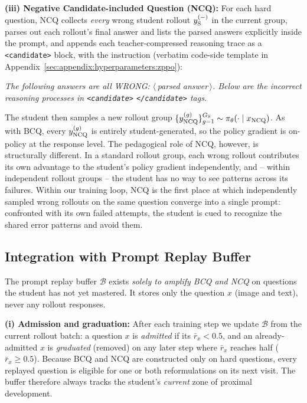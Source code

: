 \textbf{(iii) Negative Candidate-included Question (NCQ):} For each hard question, NCQ collects \emph{every} wrong student rollout $y_{\rm S}^{(-)}$ in the current group, parses out each rollout's final answer and lists the parsed answers explicitly inside the prompt, and appends each teacher-compressed reasoning trace as a \texttt{<candidate>} block, with the instruction (verbatim code-side template in Appendix~\ref{sec:appendix:hyperparameters:zppo}):
\begin{prompttemplate}
\footnotesize
\emph{The following answers are all WRONG: $\langle$\,parsed answer\,$\rangle$. Below are the incorrect reasoning processes in \texttt{<candidate>} \texttt{</candidate>} tags.}
\end{prompttemplate}
The student then samples a new rollout group $\{y_{\rm NCQ}^{(g)}\}_{g=1}^{G_{\rm S}} \sim \pi_\theta(\cdot \mid x_{\rm NCQ})$. As with BCQ, every $y_{\rm NCQ}^{(g)}$ is entirely student-generated, so the policy gradient is on-policy at the response level. The pedagogical role of NCQ, however, is structurally different. In a standard rollout group, each wrong rollout contributes its own advantage to the student's policy gradient independently, and -- within independent rollout groups -- the student has no way to see patterns across its failures. Within our training loop, NCQ is the first place at which independently sampled wrong rollouts on the same question converge into a single prompt: confronted with its own failed attempts, the student is cued to recognize the shared error patterns and avoid them.


\subsection{Integration with Prompt Replay Buffer}
\label{sec:method:buffer}

The prompt replay buffer $\mathcal{B}$ exists \emph{solely to amplify BCQ and NCQ} on questions the student has not yet mastered. It stores only the question $x$ (image and text), never any rollout responses.

\textbf{(i) Admission and graduation:} After each training step we update $\mathcal{B}$ from the current rollout batch: a question $x$ is \emph{admitted} if its $\bar{r}_x\!<\!0.5$, and an already-admitted $x$ is \emph{graduated} (removed) on any later step where $\bar{r}_x$ reaches half ($\bar{r}_x\!\geq\!0.5$). Because BCQ and NCQ are constructed only on hard questions, every replayed question is eligible for one or both reformulations on its next visit. The buffer therefore always tracks the student's \emph{current} zone of proximal development.


